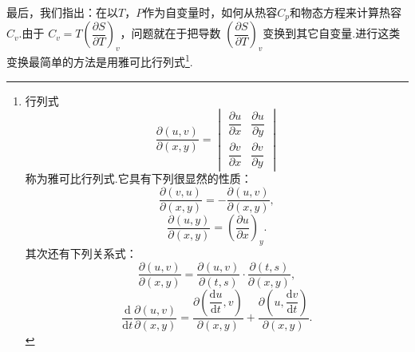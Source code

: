 最后，我们指出：在以$T$，$P$作为自变量时，如何从热容$C_p$和物态方程来计算热容$C_v$.由于
$C_v=T\left(\dfrac{\partial S}{\partial T}\right)_v$，问题就在于把导数
$\left(\dfrac{\partial S}{\partial T}\right)_v$变换到其它自变量.进行这类变换最简单的方法是用雅可比行列式\footnote{行列式
\begin{equation*}
  \frac{\partial(u,v)}{\partial(x,y)}
  =\begin{vmatrix}
  \dfrac{\partial u}{\partial x} & \dfrac{\partial u}{\partial y}\\
  \dfrac{\partial v}{\partial x} & \dfrac{\partial v}{\partial y}
  \end{vmatrix}
  \tag{I}
\end{equation*}
称为雅可比行列式.它具有下列很显然的性质：
\begin{equation*}
  \frac{\partial(v,u)}{\partial(x,y)}
  =-\frac{\partial(u,v)}{\partial(x,y)},
  \tag{II}
\end{equation*}
\begin{equation*}
  \frac{\partial(u,y)}{\partial(x,y)}
  =\left(\frac{\partial u}{\partial x}\right)_y.
  \tag{III}
\end{equation*}
其次还有下列关系式：
\begin{equation*}
  \frac{\partial(u,v)}{\partial(x,y)}
  =\frac{\partial(u,v)}{\partial(t,s)}\cdot\frac{\partial(t,s)}{\partial(x,y)},
  \tag{IV}
\end{equation*}
\begin{equation*}
  \frac{\mathrm{d}}{\mathrm{d}t}\frac{\partial(u,v)}{\partial(x,y)}
  =\frac{\partial\left(\dfrac{\mathrm{d}u}{\mathrm{d}t},v\right)}{\partial(x,y)}
  +\frac{\partial\left(u,\dfrac{\mathrm{d}v}{\mathrm{d}t}\right)}{\partial(x,y)}.
  \tag{V}
\end{equation*}}.

